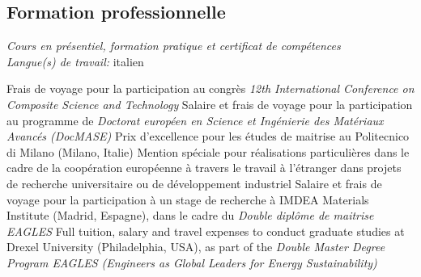 \documentclass[
  a4paper, 
]{fortysecondscv}
\begin{document}
\subsection{Formation professionnelle}
\begin{cvtable}
		{{\small\emph{\small Cours en pr\'esentiel, formation pratique et certificat de comp\'etences}\\\textit{\small Langue(s) de travail:} italien}}
\end{cvtable}


\newpage


\begin{cvtable}
		{{\small Frais de voyage pour la participation au congr\`es \emph{\small 12th International Conference on Composite Science and Technology}}}
		{{\small Salaire et frais de voyage pour la participation au programme de \emph{\small Doctorat europ\'een en Science et Ing\'enierie des Mat\'eriaux Avanc\'es (DocMASE)}}}
		{{\small Prix d'excellence pour les \'etudes de maitrise au Politecnico di Milano (Milano, Italie)}}
		{{\small Mention sp\'eciale pour r\'ealisations particuli\`eres dans le cadre de la coop\'eration europ\'eenne \`a travers le travail \`a l'\'etranger dans projets de recherche universitaire ou de d\'eveloppement industriel}}
		{{\small Salaire et frais de voyage pour la participation \`a un stage de recherche \`a IMDEA Materials Institute (Madrid, Espagne), dans le cadre du \emph{\small Double dipl\^ome de maitrise EAGLES}}}
		{{\small Full tuition, salary and travel expenses to conduct graduate studies at Drexel University (Philadelphia, USA), as part of the \emph{\small Double Master Degree Program EAGLES (Engineers as Global Leaders for Energy Sustainability)}}}

\end{cvtable}
\end{document}
